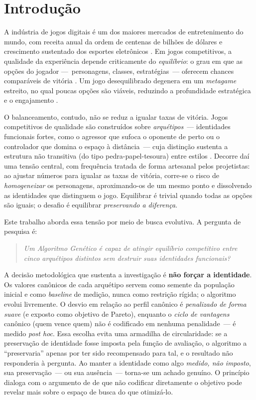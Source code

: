 \documentclass[12pt]{article}
\begin{document}
\section{Introdução}

A indústria de jogos digitais é um dos maiores mercados de entretenimento do
mundo, com receita anual da ordem de centenas de bilhões de dólares e crescimento
sustentado dos esportes eletrônicos
\cite{newzoo2025,pgb2026,hamari2017esports,reitman2020esports}. Em jogos
competitivos, a qualidade da experiência depende criticamente do \emph{equilíbrio}:
o grau em que as opções do jogador ---~personagens, classes, estratégias~---
oferecem chances comparáveis de vitória \cite{adams2014fundamentals,schell2019art}.
Um jogo desequilibrado degenera em um \emph{metagame} estreito, no qual poucas
opções são viáveis, reduzindo a profundidade estratégica e o engajamento
\cite{sirlin2006playing,sweetser2005gameflow}.

O balanceamento, contudo, não se reduz a igualar taxas de vitória. Jogos
competitivos de qualidade são construídos sobre \emph{arquétipos}~--- identidades
funcionais fortes, como o agressor que sufoca o oponente de perto ou o
controlador que domina o espaço à distância~--- cuja distinção sustenta a
estrutura não transitiva (do tipo pedra-papel-tesoura) entre estilos
\cite{gingold2006rps,elias2012characteristics}. Decorre daí uma tensão central,
com frequência tratada de forma artesanal pelos projetistas: ao ajustar números
para igualar as taxas de vitória, corre-se o risco de \emph{homogeneizar} os
personagens, aproximando-os de um mesmo ponto e dissolvendo as identidades que
distinguem o jogo. Equilibrar é trivial quando todas as opções são iguais; o
desafio é equilibrar \emph{preservando a diferença}.

Este trabalho aborda essa tensão por meio de busca evolutiva. A pergunta de
pesquisa é:

\begin{quote}
\emph{Um Algoritmo Genético é capaz de atingir equilíbrio competitivo entre cinco
arquétipos distintos sem destruir suas identidades funcionais?}
\end{quote}

A decisão metodológica que sustenta a investigação é \textbf{não forçar a
identidade}. Os valores canônicos de cada arquétipo servem como semente da
população inicial e como \emph{baseline} de medição, nunca como restrição rígida;
o algoritmo evolui livremente. O desvio em relação ao perfil canônico é
\emph{penalizado de forma suave} (e exposto como objetivo de Pareto), enquanto o
\emph{ciclo de vantagens} canônico (quem vence quem) não é codificado em nenhuma
penalidade~--- é medido \emph{post hoc}. Essa escolha evita uma armadilha de
circularidade: se a preservação de identidade fosse imposta pela função de
avaliação, o algoritmo a ``preservaria'' apenas por ter sido recompensado para
tal, e o resultado não responderia à pergunta. Ao manter a identidade como algo
\emph{medido, não imposto}, sua preservação~--- ou sua ausência~--- torna-se um
achado genuíno. O princípio dialoga com o argumento de \cite{lehman2011novelty}
de que não codificar diretamente o objetivo pode revelar mais sobre o espaço de
busca do que otimizá-lo.
\end{document}
